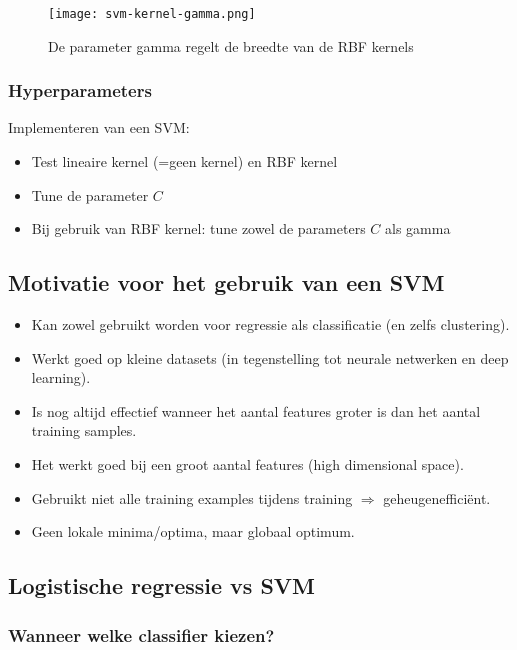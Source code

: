\documentclass{article}
\begin{document}
\begin{figure}[H]
    \centering
    \texttt{[image: svm-kernel-gamma.png]}
    \caption{De parameter gamma regelt de breedte van de RBF kernels}
\end{figure}

\subsubsection{Hyperparameters}

Implementeren van een SVM:

\begin{itemize}
    \item Test lineaire kernel (=geen kernel) en RBF kernel
    \item Tune de parameter $C$
    \item Bij gebruik van RBF kernel: tune zowel de parameters $C$ als gamma
\end{itemize}

\subsection{Motivatie voor het gebruik van een SVM}

\begin{itemize}
    \item Kan zowel gebruikt worden voor regressie als classificatie (en zelfs clustering).
    \item Werkt goed op kleine datasets (in tegenstelling tot neurale netwerken en deep learning).
    \item Is nog altijd effectief wanneer het aantal features groter is dan het aantal training samples.
    \item Het werkt goed bij een groot aantal features (high dimensional space).
    \item Gebruikt niet alle training examples tijdens training $\Rightarrow$ geheugenefficiënt.
    \item Geen lokale minima/optima, maar globaal optimum.
\end{itemize}

\subsection{Logistische regressie vs SVM}

\subsubsection{Wanneer welke classifier kiezen?}
\end{document}
